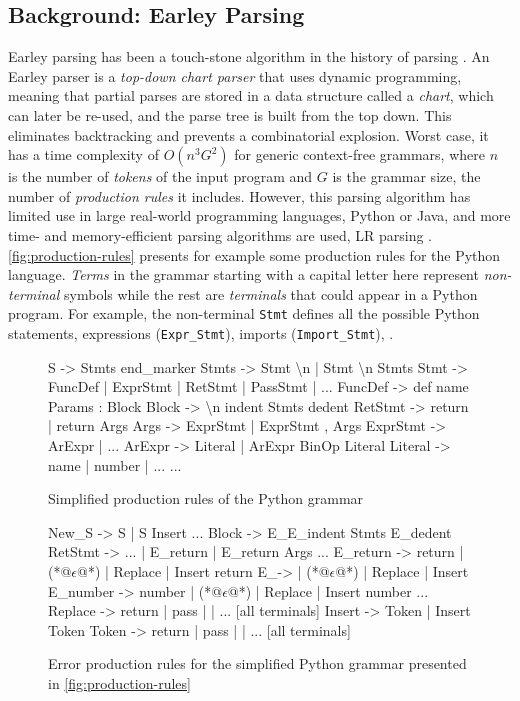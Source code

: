 \subsection{Background: Earley Parsing}
\label{sec:overview:earleyparsing}

 Earley parsing has been a touch-stone algorithm in the
history of parsing \citep{Earley_1970}. An Earley parser is a \emph{top-down
chart parser} that uses dynamic programming, meaning that partial parses are
stored in a data structure called a \emph{chart}, which can later be re-used,
and the parse tree is built from the top down. This eliminates backtracking and
prevents a combinatorial explosion. Worst case, it has a time complexity of
$O(n^3 G^2)$ for generic context-free grammars, where $n$ is the number of
\emph{tokens} of the input program and $G$ is the grammar size, \ie the number
of \emph{production rules} it includes. However, this parsing algorithm has
limited use in large real-world programming languages, \eg Python or Java, and
more time- and memory-efficient parsing algorithms are used, \eg LR parsing \etc
\citep{Knuth_1965, Chapman_1987}. \autoref{fig:production-rules} presents for
example some production rules for the Python language. \emph{Terms} in the
grammar starting with a capital letter here represent \emph{non-terminal}
symbols while the rest are \emph{terminals} that could appear in a Python
program. For example, the non-terminal \texttt{Stmt} defines all the possible
Python statements, \ie expressions (\texttt{Expr\_Stmt}), imports
(\texttt{Import\_Stmt}), \etc.

\begin{figure}[t]
\begin{ecode}
S        -> Stmts end_marker
Stmts    -> Stmt \textbackslash n | Stmt \textbackslash n Stmts
Stmt     -> FuncDef | ExprStmt | RetStmt | PassStmt | ...
FuncDef  -> def name Params : Block
Block    -> \textbackslash n indent Stmts dedent
RetStmt  -> return | return Args
Args     -> ExprStmt | ExprStmt , Args
ExprStmt -> ArExpr | ...
ArExpr   -> Literal | ArExpr BinOp Literal
Literal  -> name | number | ...
...
\end{ecode}
\caption{Simplified production rules of the Python grammar}
\label{fig:production-rules}
\end{figure}

\begin{figure}[t]
\begin{ecode}
New_S     -> S | S Insert
...
Block     -> E_\n E_indent Stmts E_dedent
RetStmt   -> ... | E_return | E_return Args
...
E_return  -> return | (*@$\epsilon$@*) | Replace | Insert return
E_\n      -> \n | (*@$\epsilon$@*) | Replace | Insert \n
E_number  -> number | (*@$\epsilon$@*) | Replace | Insert number
...
Replace   -> return | pass | \n | ... [all terminals]
Insert    -> Token | Insert Token
Token     -> return | pass | \n | ... [all terminals]
\end{ecode}
\caption{Error production rules for the simplified Python grammar presented in
\autoref{fig:production-rules}}
\label{fig:error-rules}
\end{figure}

